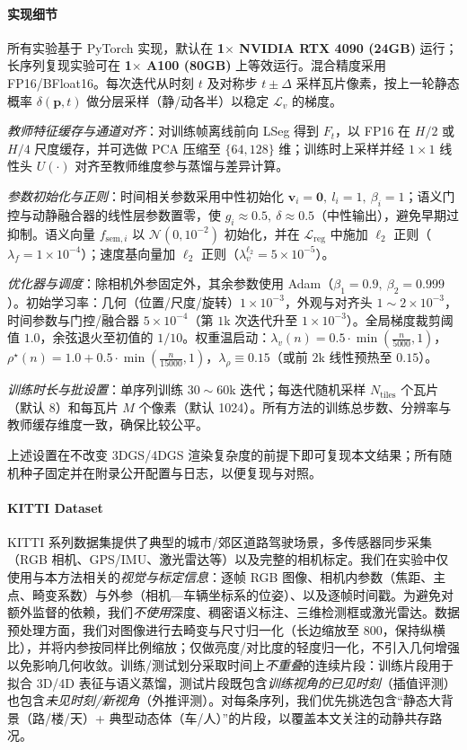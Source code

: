 \documentclass[10pt,conference]{IEEEtran} %
\begin{document}
\paragraph{实现细节}
所有实验基于 PyTorch 实现，默认在 \textbf{1$\times$ NVIDIA RTX 4090 (24GB)} 运行；长序列复现实验可在 \textbf{1$\times$ A100 (80GB)} 上等效运行。混合精度采用 FP16/BFloat16。每次迭代从时刻 \(t\) 及对称步 \(t\pm\Delta\) 采样瓦片像素，按上一轮静态概率 \(\delta(\mathbf p,t)\) 做分层采样（静/动各半）以稳定 \(\mathcal L_v\) 的梯度。

\emph{教师特征缓存与通道对齐}：对训练帧离线前向 LSeg 得到 \(F_t\)，以 FP16 在 \(H/2\) 或 \(H/4\) 尺度缓存，并可选做 PCA 压缩至 \(\{64,128\}\) 维；训练时上采样并经 \(1{\times}1\) 线性头 \(U(\cdot)\) 对齐至教师维度参与蒸馏与差异计算。

\emph{参数初始化与正则}：时间相关参数采用中性初始化 \(\bm v_i{=}\bm 0,\ l_i{=}1,\ \beta_i{=}1\)；语义门控与动静融合器的线性层参数置零，使 \(g_i\!\approx\!0.5,\ \delta\!\approx\!0.5\)（中性输出），避免早期过抑制。语义向量 \(f_{\mathrm{sem},i}\) 以 \(\mathcal N(0,10^{-2})\) 初始化，并在 \(\mathcal L_{\mathrm{reg}}\) 中施加 \(\ell_2\) 正则（\(\lambda_f{=}1\times10^{-4}\)）；速度基向量加 \(\ell_2\) 正则（\(\lambda_v^{\ell_2}{=}5\times10^{-5}\)）。

\emph{优化器与调度}：除相机外参固定外，其余参数使用 Adam（\(\beta_1{=}0.9,\ \beta_2{=}0.999\)）。初始学习率：几何（位置/尺度/旋转）\(1\times10^{-3}\)，外观与对齐头 \(1\!\sim\!2\times10^{-3}\)，时间参数与门控/融合器 \(5\times10^{-4}\)（第 \(1\)k 次迭代升至 \(1\times10^{-3}\)）。全局梯度裁剪阈值 \(1.0\)，余弦退火至初值的 \(1/10\)。权重温启动：\(\lambda_v(n){=}0.5\cdot\min(\frac{n}{5000},1)\)，\(\rho^\star(n){=}1.0+0.5\cdot\min(\frac{n}{15000},1)\)，\(\lambda_\rho\equiv0.15\)（或前 \(2\)k 线性预热至 \(0.15\)）。

\emph{训练时长与批设置}：单序列训练 \(30\!\sim\!60\)k 迭代；每迭代随机采样 \(N_{\text{tiles}}\) 个瓦片（默认 8）和每瓦片 \(M\) 个像素（默认 1024）。所有方法的训练总步数、分辨率与教师缓存维度一致，确保比较公平。

上述设置在不改变 3DGS/4DGS 渲染复杂度的前提下即可复现本文结果；所有随机种子固定并在附录公开配置与日志，以便复现与对照。


\paragraph{\textbf{KITTI Dataset}}
KITTI 系列数据集提供了典型的城市/郊区道路驾驶场景，多传感器同步采集（RGB 相机、GPS/IMU、激光雷达等）以及完整的相机标定。我们在实验中仅使用与本方法相关的\emph{视觉与标定信息}：逐帧 RGB 图像、相机内参数（焦距、主点、畸变系数）与外参（相机—车辆坐标系的位姿）、以及逐帧时间戳。为避免对额外监督的依赖，我们\emph{不使用}深度、稠密语义标注、三维检测框或激光雷达。数据预处理方面，我们对图像进行去畸变与尺寸归一化（长边缩放至 $800$，保持纵横比），并将内参按同样比例缩放；仅做亮度/对比度的轻度归一化，不引入几何增强以免影响几何收敛。训练/测试划分采取时间上\emph{不重叠}的连续片段：训练片段用于拟合 3D/4D 表征与语义蒸馏，测试片段既包含\emph{训练视角的已见时刻}（插值评测）也包含\emph{未见时刻/新视角}（外推评测）。对每条序列，我们优先挑选包含“静态大背景（路/楼/天）+ 典型动态体（车/人）”的片段，以覆盖本文关注的动静共存路况。
\end{document}
